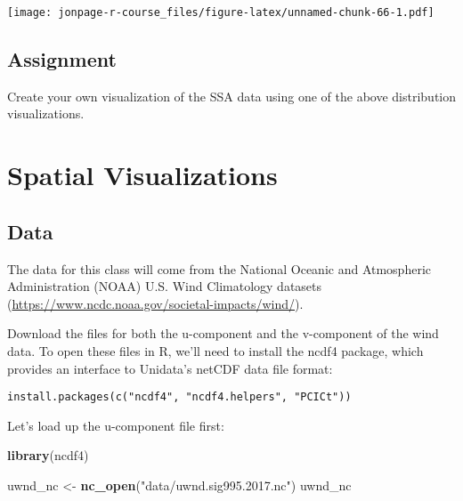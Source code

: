 \documentclass[]{book}
\newenvironment{Shaded}{\begin{snugshade}}{\end{snugshade}}
\newcommand{\KeywordTok}[1]{\textcolor[rgb]{0.13,0.29,0.53}{\textbf{{#1}}}}
\newcommand{\StringTok}[1]{\textcolor[rgb]{0.31,0.60,0.02}{{#1}}}
\newcommand{\NormalTok}[1]{{#1}}
\theoremstyle{definition}
\theoremstyle{definition}
\theoremstyle{remark}
\begin{document}
\texttt{[image: jonpage-r-course\_files/figure-latex/unnamed-chunk-66-1.pdf]}

\section{Assignment}\label{assignment-3}

Create your own visualization of the SSA data using one of the above
distribution visualizations.

\hypertarget{geom_spoke}{\chapter{Spatial
Visualizations}\label{geom_spoke}}

\section{Data}\label{data-4}

The data for this class will come from the National Oceanic and
Atmospheric Administration (NOAA) U.S. Wind Climatology datasets
(\url{https://www.ncdc.noaa.gov/societal-impacts/wind/}).

Download the files for both the u-component and the v-component of the
wind data. To open these files in R, we'll need to install the ncdf4
package, which provides an interface to Unidata's netCDF data file
format:

\begin{verbatim}
install.packages(c("ncdf4", "ncdf4.helpers", "PCICt"))
\end{verbatim}

Let's load up the u-component file first:

\begin{Shaded}
\begin{Highlighting}[]
\KeywordTok{library}\NormalTok{(ncdf4)}

\NormalTok{uwnd_nc <-}\StringTok{ }\KeywordTok{nc_open}\NormalTok{(}\StringTok{"data/uwnd.sig995.2017.nc"}\NormalTok{)}
\NormalTok{uwnd_nc}
\end{Highlighting}
\end{Shaded}
\end{document}
